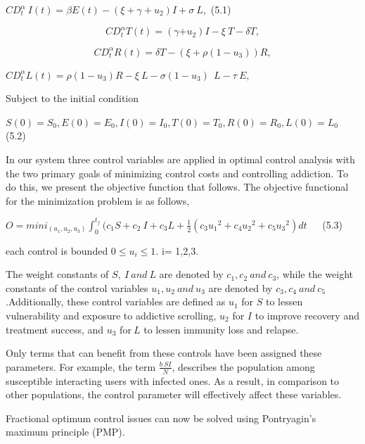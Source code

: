\documentclass[10pt]{NSP1}
\begin{document}
$CD_{t}^{\alpha}\ I(t) = \beta E(t) - (\xi + \gamma + u_{2})I + \sigma\ L,$ (5.1)

\begin{equation}
CD_{t}^{\alpha}T(t) = (\gamma{+ u}_{2})I - \xi\ T - \delta T,

\end{equation}

\begin{equation}
CD_{t}^{\alpha}R(t) = \delta T - (\xi + \rho\left( 1 - u_{3} \right))R,

\end{equation}

$CD_{t}^{\alpha}L(t) = \rho\left( 1 - u_{3} \right)R - \xi\ L - \sigma(1 - u_{3})\ \ L - \tau\ E,$

Subject to the initial condition

$S(0) = S_{0},E(0) = E_{0},I(0) = I_{0},T(0) = T_{0},R(0) = R_{0},L(0) = L_{0}$ (5.2)

In our system three control variables are applied in optimal control analysis with the two primary goals of minimizing control costs and controlling addiction. To do this, we present the objective function that follows. The objective functional for the minimization problem is as follows,

$O = {mini}_{\left( u_{1},u_{2},u_{3} \right)}\int_{0}^{t_{f}}{}(c_{1}S + c_{2}\ I + c_{3}L + \frac{1}{2}\left( c_{3}{u_{1}}^{2} + c_{4}{u_{2}}^{2} + c_{5}{u_{3}}^{2} \right)dt\ \ \ \ \ \ \ $(5.3)

each control is bounded $0 \leq u_{i} \leq 1$. i= 1,2,3.

The weight constants of $S,\ I\ and\ L$ are denoted by $c_{1},c_{2}\ and\ c_{3}$, while the weight constants of the control variables $u_{1},u_{2}\ and\ u_{3}$ are denoted by $c_{3},c_{4}\ and\ c_{5}$.Additionally, these control variables are defined as $u_{1}$ for $S$ to lessen vulnerability and exposure to addictive scrolling, $u_{2}$ for $I$ to improve recovery and treatment success, and $u_{3}$ for$\ L$ to lessen immunity loss and relapse.

Only terms that can benefit from these controls have been assigned these parameters. For example, the term $\frac{b\ SI}{N}$, describes the population among susceptible interacting users with infected ones. As a result, in comparison to other populations, the control parameter will effectively affect these variables.

Fractional optimum control issues can now be solved using Pontryagin's maximum principle (PMP).
\end{document}
